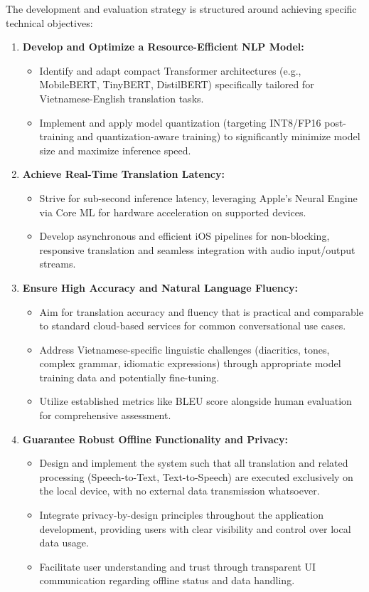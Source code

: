 \documentclass[12pt]{article}
\begin{document}
The development and evaluation strategy is structured around achieving specific technical objectives:
\begin{enumerate}
    \item \textbf{Develop and Optimize a Resource-Efficient NLP Model:}
    \begin{itemize}
        \item Identify and adapt compact Transformer architectures (e.g., MobileBERT, TinyBERT, DistilBERT) specifically tailored for Vietnamese-English translation tasks.
        \item Implement and apply model quantization (targeting INT8/FP16 post-training and quantization-aware training) to significantly minimize model size and maximize inference speed.
    \end{itemize}
    \item \textbf{Achieve Real-Time Translation Latency:}
    \begin{itemize}
        \item Strive for sub-second inference latency, leveraging Apple's Neural Engine via Core ML for hardware acceleration on supported devices.
        \item Develop asynchronous and efficient iOS pipelines for non-blocking, responsive translation and seamless integration with audio input/output streams.
    \end{itemize}
    \item \textbf{Ensure High Accuracy and Natural Language Fluency:}
    \begin{itemize}
        \item Aim for translation accuracy and fluency that is practical and comparable to standard cloud-based services for common conversational use cases.
        \item Address Vietnamese-specific linguistic challenges (diacritics, tones, complex grammar, idiomatic expressions) through appropriate model training data and potentially fine-tuning.
        \item Utilize established metrics like BLEU score alongside human evaluation for comprehensive assessment.
    \end{itemize}
    \item \textbf{Guarantee Robust Offline Functionality and Privacy:}
    \begin{itemize}
        \item Design and implement the system such that all translation and related processing (Speech-to-Text, Text-to-Speech) are executed exclusively on the local device, with no external data transmission whatsoever.
        \item Integrate privacy-by-design principles throughout the application development, providing users with clear visibility and control over local data usage.
    \item Facilitate user understanding and trust through transparent UI communication regarding offline status and data handling.
    \end{itemize}
\end{enumerate}
\end{document}
